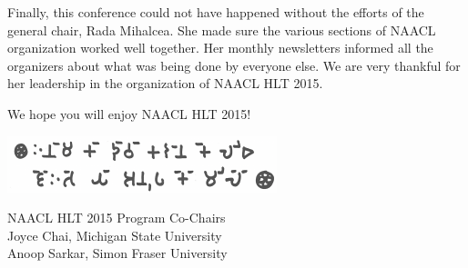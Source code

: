 Finally, this conference could not have happened without the efforts
of the general chair, Rada Mihalcea. She made sure the various
sections of NAACL organization worked well together. Her monthly
newsletters informed all the organizers about what was being done
by everyone else. We are very thankful for her leadership in the
organization of NAACL HLT 2015.

We hope you will enjoy NAACL HLT 2015!

\noindent\includegraphics[scale=1.5]{content/fmatter/easteregg.pdf}

NAACL HLT 2015 Program Co-Chairs \\
Joyce Chai, Michigan State University \\
Anoop Sarkar, Simon Fraser University
